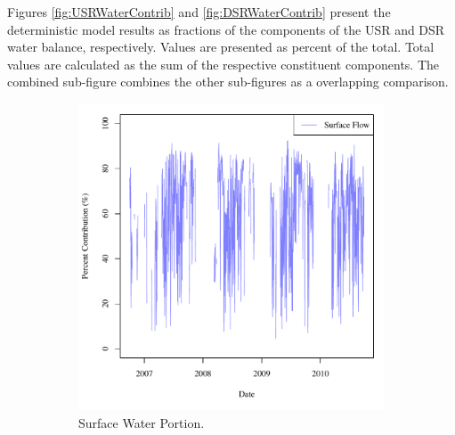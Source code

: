 \begin{linenumbers}
Figures \ref{fig:USRWaterContrib} and \ref{fig:DSRWaterContrib} present the deterministic model results as fractions of the components of the USR and DSR water balance, respectively.  Values are presented as percent of the total.  Total values are calculated as the sum of the respective constituent components.  The combined sub-figure combines the other sub-figures as a overlapping comparison.  

\begin{figure}[htbp]
\centering
	\begin{subfigure}{0.5\textwidth}
		\centering
		\includegraphics[width=\tableCustomSize]{"Figures/Results_USR/Stochastic/M Water Contrib 1"}
		\caption{Surface Water Portion.}
	\end{subfigure}%
	\begin{subfigure}{0.5\textwidth}
		\centering

\end{subfigure}
\end{figure}
\end{linenumbers}
